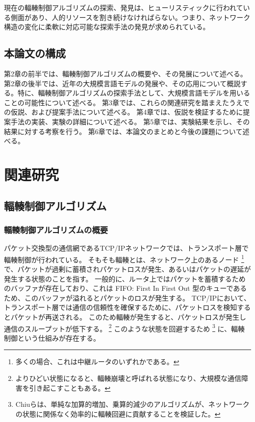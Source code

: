 \documentclass[a4paper,11pt]{jreport}
\begin{document}
現在の輻輳制御アルゴリズムの探索、発見は、ヒューリスティックに行われている側面があり、人的リソースを割き続けなければらない。つまり、ネットワーク構造の変化に柔軟に対応可能な探索手法の発見が求められている。

\newpage

\section{本論文の構成}

第2章の前半では、輻輳制御アルゴリズムの概要や、その発展について述べる。
第2章の後半では、近年の大規模言語モデルの発展や、その応用について概説する。特に、輻輳制御アルゴリズムの探索手法として、大規模言語モデルを用いることの可能性について述べる。
第3章では、これらの関連研究を踏まえたうえでの仮説、および提案手法について述べる。
第4章では、仮説を検証するために提案手法の実装、実験の詳細について述べる。
第5章では、実験結果を示し、その結果に対する考察を行う。
第6章では、本論文のまとめと今後の課題について述べる。

\newpage

\chapter{関連研究}
\section{輻輳制御アルゴリズム}

\subsection{輻輳制御アルゴリズムの概要}

パケット交換型の通信網であるTCP/IPネットワークでは、トランスポート層で輻輳制御が行われている。
そもそも輻輳とは、ネットワーク上のあるノード
\footnote{多くの場合、これは中継ルータのいずれかである。}
で、パケットが過剰に蓄積されパケットロスが発生、あるいはパケットの遅延が発生する状態のことを指す。
一般的に、ルータ上ではパケットを蓄積するためのバッファが存在しており、これは FIFO: First In First Out 型のキューであるため、このバッファが溢れるとパケットのロスが発生する。
TCP/IPにおいて、トランスポート層では通信の信頼性を確保するために、パケットロスを検知するとパケットが再送される。
このため輻輳が発生すると、パケットロスが発生し通信のスループットが低下する。
\footnote{よりひどい状態になると、輻輳崩壊と呼ばれる状態になり、大規模な通信障害を引き起こすこともある。}
このような状態を回避するため
\footnote{Chiuら\cite{CHIU19891}は、単純な加算的増加、乗算的減少のアルゴリズムが、ネットワークの状態に関係なく効率的に輻輳回避に貢献することを検証した。}
に、輻輳制御という仕組みが存在する。
\end{document}
